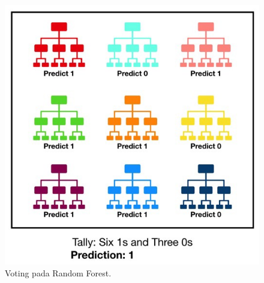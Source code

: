 \begin{enumerate}
	\begin{figure}[H]
		\centering
		\includegraphics[width=8 cm]{figures/1174006/chapter3/soalteori/1.jpeg}
		\caption{Voting pada Random Forest.}
	\end{figure}

\end{enumerate}


